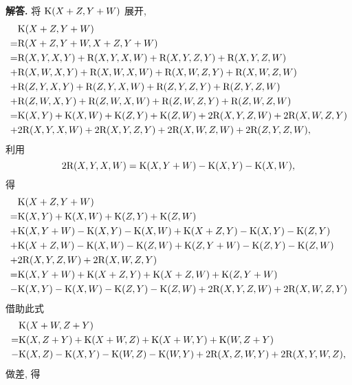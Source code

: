 \documentclass{ctexart}
\newenvironment{solution}{\par\noindent\textbf{解答. }}{\par}
\begin{document}
\begin{solution}
    将 $\mathrm{K}(X + Z, Y + W)$ 展开,
    \[
        \begin{aligned}
             & \mathrm{K}(X + Z, Y + W) \\
            =& \mathrm{R}(X + Z, Y + W, X + Z, Y + W) \\
            =& \mathrm{R}(X, Y, X, Y) + \mathrm{R}(X, Y, X, W) + \mathrm{R}(X, Y, Z, Y) + \mathrm{R}(X, Y, Z, W) \\
            +& \mathrm{R}(X, W, X, Y) + \mathrm{R}(X, W, X, W) + \mathrm{R}(X, W, Z, Y) + \mathrm{R}(X, W, Z, W) \\
            +& \mathrm{R}(Z, Y, X, Y) + \mathrm{R}(Z, Y, X, W) + \mathrm{R}(Z, Y, Z, Y) + \mathrm{R}(Z, Y, Z, W) \\
            +& \mathrm{R}(Z, W, X, Y) + \mathrm{R}(Z, W, X, W) + \mathrm{R}(Z, W, Z, Y) + \mathrm{R}(Z, W, Z, W) \\
            =& \mathrm{K}(X, Y) + \mathrm{K}(X, W) + \mathrm{K}(Z, Y) + \mathrm{K}(Z, W) + 2\mathrm{R}(X, Y, Z, W) + 2\mathrm{R}(X, W, Z, Y) \\
            +& 2\mathrm{R}(X, Y, X, W) + 2\mathrm{R}(X, Y, Z, Y) +2\mathrm{R}(X, W, Z, W) + 2\mathrm{R}(Z, Y, Z, W), 
        \end{aligned}
    \]
    利用
    \[
        2\mathrm{R}(X, Y, X, W) = \mathrm{K}(X, Y + W) - \mathrm{K}(X, Y) - \mathrm{K}(X, W),
    \]
    得
    \[
        \begin{aligned}
             & \mathrm{K}(X + Z, Y + W) \\
            =& \mathrm{K}(X, Y) + \mathrm{K}(X, W) + \mathrm{K}(Z, Y) + \mathrm{K}(Z, W) \\
            +& \mathrm{K}(X, Y + W) - \mathrm{K}(X, Y) - \mathrm{K}(X, W) + \mathrm{K}(X + Z, Y) - \mathrm{K}(X, Y) - \mathrm{K}(Z, Y) \\
            +& \mathrm{K}(X + Z, W) - \mathrm{K}(X, W) - \mathrm{K}(Z, W) + \mathrm{K}(Z, Y + W) - \mathrm{K}(Z, Y) - \mathrm{K}(Z, W) \\
            +& 2\mathrm{R}(X, Y, Z, W) + 2\mathrm{R}(X, W, Z, Y) \\
            =& \mathrm{K}(X, Y + W) + \mathrm{K}(X + Z, Y) + \mathrm{K}(X + Z, W) + \mathrm{K}(Z, Y + W) \\
            -& \mathrm{K}(X, Y) - \mathrm{K}(X, W) - \mathrm{K}(Z, Y) - \mathrm{K}(Z, W) + 2\mathrm{R}(X, Y, Z, W) + 2\mathrm{R}(X, W, Z, Y)
       \end{aligned}
    \]
    借助此式
    \[
        \begin{aligned}
             & \mathrm{K}(X + W, Z + Y) \\
            =& \mathrm{K}(X, Z + Y) + \mathrm{K}(X + W, Z) + \mathrm{K}(X + W, Y) + \mathrm{K}(W, Z + Y) \\
            -& \mathrm{K}(X, Z) - \mathrm{K}(X, Y) - \mathrm{K}(W, Z) - \mathrm{K}(W, Y) + 2\mathrm{R}(X, Z, W, Y) + 2\mathrm{R}(X, Y, W, Z),
        \end{aligned}
    \]
    做差, 得
    \[
        \begin{aligned}

\end{aligned}\]
\end{solution}
\end{document}
